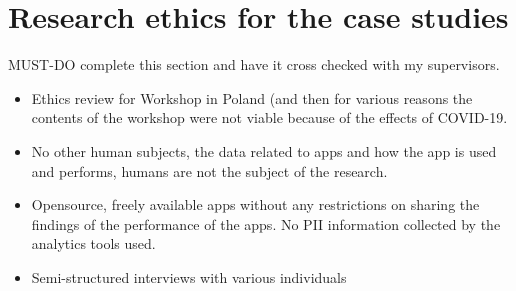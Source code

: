 \section{Research ethics for the case studies}
\label{section-research-ethics-for-the-case-studies}

MUST-DO complete this section and have it cross checked with my supervisors.

\begin{itemize}
    \item Ethics review for Workshop in Poland (and then for various reasons the contents of the workshop were not viable because of the effects of COVID-19.
    \item No other human subjects, the data related to apps and how the app is used and performs, humans are not the subject of the research.
    \item Opensource, freely available apps without any restrictions on sharing the findings of the performance of the apps. No PII information collected by the analytics tools used.
    \item Semi-structured interviews with various individuals 
\end{itemize}

\clearpage


\clearpage


\clearpage


\clearpage


\clearpage


\clearpage


\clearpage


\clearpage


\clearpage


\clearpage